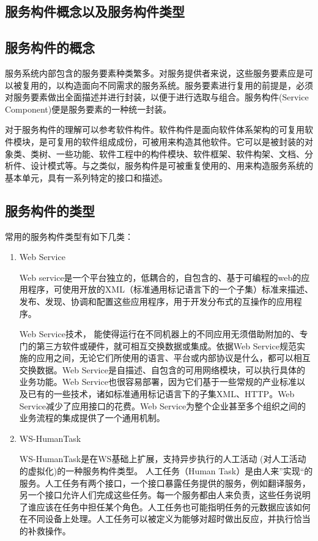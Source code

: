 \documentclass[11pt,a4paper]{article}
\begin{document}
\begin{CJK}{UTF8}{gbsn}
\section{服务构件概念以及服务构件类型}

\subsection{服务构件的概念}
 
服务系统内部包含的服务要素种类繁多。对服务提供者来说，这些服务要素应是可以被复用的，以构造面向不同需求的服务系统。服务要素进行复用的前提是，必须对服务要素做出全面描述并进行封装，以便于进行选取与组合。服务构件(Service Component)便是服务要素的一种统一封装。

对于服务构件的理解可以参考软件构件。软件构件是面向软件体系架构的可复用软件模块，是可复用的软件组成成份，可被用来构造其他软件。它可以是被封装的对象类、类树、一些功能、软件工程中的构件模块、软件框架、软件构架、文档、分析件、设计模式等。与之类似，服务构件是可被重复使用的、用来构造服务系统的基本单元，具有一系列特定的接口和描述。


\subsection{服务构件的类型}

常用的服务构件类型有如下几类：

\begin{enumerate}
\item Web Service 

    Web service是一个平台独立的，低耦合的，自包含的、基于可编程的web的应用程序，可使用开放的XML（标准通用标记语言下的一个子集）标准来描述、发布、发现、协调和配置这些应用程序，用于开发分布式的互操作的应用程序。
    
    Web Service技术， 能使得运行在不同机器上的不同应用无须借助附加的、专门的第三方软件或硬件，就可相互交换数据或集成。依据Web Service规范实施的应用之间，无论它们所使用的语言、平台或内部协议是什么，都可以相互交换数据。Web Service是自描述、自包含的可用网络模块，可以执行具体的业务功能。Web Service也很容易部署，因为它们基于一些常规的产业标准以及已有的一些技术，诸如标准通用标记语言下的子集XML、HTTP。Web Service减少了应用接口的花费。Web Service为整个企业甚至多个组织之间的业务流程的集成提供了一个通用机制。

\item WS-HumanTask

    WS-HumanTask是在WS基础上扩展，支持异步执行的人工活动 (对人工活动的虚拟化)的一种服务构件类型。
    人工任务（Human Task）是由人来”实现“的服务。人工任务有两个接口，一个接口暴露任务提供的服务，例如翻译服务，另一个接口允许人们完成这些任务。每一个服务都由人来负责，这些任务说明了谁应该在任务中担任某个角色。人工任务也可能指明任务的元数据应该如何在不同设备上处理。人工任务可以被定义为能够对超时做出反应，并执行恰当的补救操作。
    

\end{enumerate}
\end{CJK}
\end{document}
